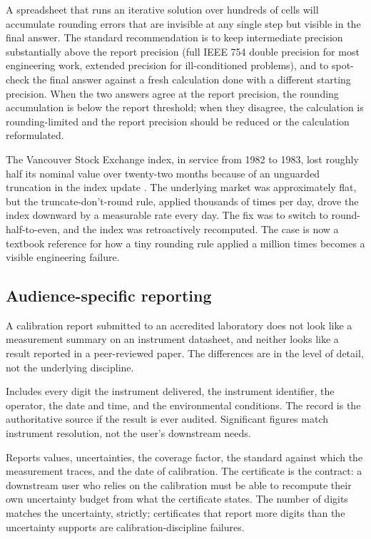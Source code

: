 A spreadsheet that runs an iterative solution over hundreds of
cells will accumulate rounding errors that are invisible at any
single step but visible in the final answer. The standard
recommendation is to keep intermediate precision substantially
above the report precision (full IEEE 754 double precision for most
engineering work, extended precision for ill-conditioned problems),
and to spot-check the final answer against a fresh calculation done
with a different starting precision. When the two answers agree at
the report precision, the rounding accumulation is below the report
threshold; when they disagree, the calculation is rounding-limited
and the report precision should be reduced or the calculation
reformulated.

The Vancouver Stock Exchange index, in service from 1982 to 1983,
lost roughly half its nominal value over twenty-two months because
of an unguarded truncation in the index update
\cite{paper:quinn-vse-1983}. The underlying market was approximately
flat, but the truncate-don't-round rule, applied thousands of times
per day, drove the index downward by a measurable rate every day.
The fix was to switch to round-half-to-even, and the index was
retroactively recomputed. The case is now a textbook reference for
how a tiny rounding rule applied a million times becomes a visible
engineering failure.

\subsection{Audience-specific reporting}

A calibration report submitted to an accredited laboratory does
not look like a measurement summary on an instrument datasheet,
and neither looks like a result reported in a peer-reviewed paper.
The differences are in the level of detail, not the underlying
discipline.

 Includes every digit the instrument
delivered, the instrument identifier, the operator, the date and
time, and the environmental conditions. The record is the
authoritative source if the result is ever audited. Significant
figures match instrument resolution, not the user's downstream
needs.

 Reports values, uncertainties,
the coverage factor, the standard against which the measurement
traces, and the date of calibration. The certificate is the
contract: a downstream user who relies on the calibration must be
able to recompute their own uncertainty budget from what the
certificate states. The number of digits matches the uncertainty,
strictly; certificates that report more digits than the uncertainty
supports are calibration-discipline failures.

